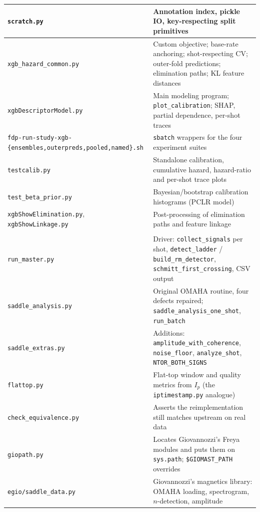 \documentclass[11pt,a4paper]{article}
\newcommand{\code}[1]{\texttt{\small #1}}
\newcommand{\bk}{\discretionary{}{}{}}   %
\begin{document}
\begin{longtable}{@{}>{\raggedright\arraybackslash}p{}>{\raggedright\arraybackslash}p{}@{}}
\code{scratch.py} & Annotation index, pickle IO, key-respecting split primitives \\
\midrule
\code{xgb\_hazard\_common.py} & Custom objective; base-rate anchoring; shot-respecting CV; outer-fold predictions; elimination paths; KL feature distances \\
\code{xgbDescriptorModel.py} & Main modeling program; \code{plot\_calibration}; SHAP, partial dependence, per-shot traces \\
\code{fdp-\bk run-\bk study-\bk xgb-\bk \{ensembles,\bk outerpreds,\bk pooled,\bk named\}.sh} & \code{sbatch} wrappers for the four experiment suites \\
\code{testcalib.py} & Standalone calibration, cumulative hazard, hazard-ratio and per-shot trace plots \\
\code{test\_beta\_prior.py} & Bayesian/bootstrap calibration histograms (PCLR model) \\
\code{xgbShowElimination.py}, \code{xgbShowLinkage.py} & Post-processing of elimination paths and feature linkage \\
\midrule
\multicolumn{2}{@{}l}{\textbf{MAST-U side} (\code{\textasciitilde/Dropbox/Python/Hazard})} \\
\midrule
\code{run\_master.py} & Driver: \code{collect\_signals} per shot, \code{detect\_ladder} / \code{build\_rm\_detector}, \code{schmitt\_first\_crossing}, CSV output \\
\code{saddle\_analysis.py} & Original OMAHA routine, four defects repaired; \code{saddle\_analysis\_one\_shot}, \code{run\_batch} \\
\code{saddle\_extras.py} & Additions: \code{amplitude\_with\_coherence}, \code{noise\_floor}, \code{analyze\_shot}, \code{NTOR\_BOTH\_SIGNS} \\
\code{flattop.py} & Flat-top window and quality metrics from $I_p$ (the \code{iptimestamp.py} analogue) \\
\code{check\_equivalence.py} & Asserts the reimplementation still matches upstream on real data \\
\code{giopath.py} & Locates Giovannozzi's Freya modules and puts them on \code{sys.path}; \code{\$GIOMAST\_PATH} overrides \\
\code{egio/saddle\_data.py} & Giovannozzi's magnetics library: OMAHA loading, spectrogram, $n$-detection, amplitude \\
\bottomrule
\end{longtable}
\end{document}
